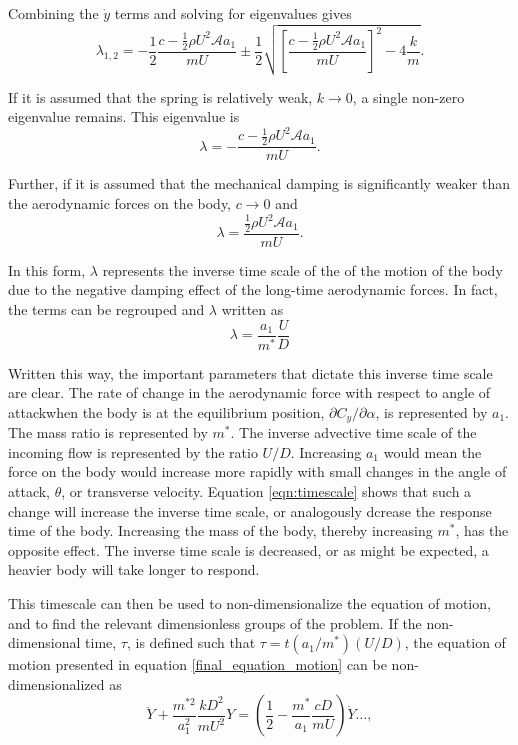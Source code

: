 Combining the $\dot{y}$ terms and solving for eigenvalues gives
\begin{equation}
  \label{eqn:eigs}
  \lambda_{1,2}= -\frac{1}{2}\frac{c-\frac{1}{2}\rho U^2\mathcal{A}a_1}{mU}\pm\frac{1}{2}\sqrt{\left[\frac{c-\frac{1}{2}\rho U^2\mathcal{A}a_1}{mU}\right]^2-4\frac{k}{m}}.
\end{equation}

If it is assumed that the spring is relatively weak, $k\rightarrow 0$, a single non-zero eigenvalue remains. This eigenvalue is
\begin{equation}
  \label{eqn:eigs_nospring}
  \lambda=-\frac{c-\frac{1}{2}\rho U^2\mathcal{A}a_1}{mU}.
\end{equation}

Further, if it is assumed that the mechanical damping is significantly weaker than the aerodynamic forces on the body, $c\rightarrow 0$ and
\begin{equation}
  \label{eqn:eigs_nospring_nodamp}
  \lambda=\frac{\frac{1}{2}\rho U^2\mathcal{A}a_1}{mU}.
\end{equation}

In this form, $\lambda$ represents the inverse time scale of the of the motion of the body due to the negative damping effect of the long-time aerodynamic forces. In fact, the terms can be regrouped and $\lambda$ written as
\begin{equation}
  \label{eqn:timescale}
  \lambda = \frac{a_1}{m^*}\frac{U}{D}
\end{equation}

Written this way, the important parameters that dictate this inverse time scale are clear. The rate of change in the aerodynamic force with respect to angle of attackwhen the body is at the equilibrium position, $\partial C_y/\partial \alpha$, is represented by $a_1$. The mass ratio is represented by $m^*$. The inverse advective time scale of the incoming flow is represented by the ratio $U/D$. Increasing $a_1$ would mean the force on the body would increase more rapidly with small changes in the angle of attack, $\theta$, or transverse velocity. Equation \ref{eqn:timescale} shows that such a change will increase the inverse time scale, or analogously dcrease the response time of the body. Increasing the mass of the body, thereby increasing $m^*$, has the opposite effect. The inverse time scale is decreased, or as might be expected, a heavier body will take longer to respond.

This timescale can then be used to non-dimensionalize the equation of motion, and to find the relevant dimensionless groups of the problem. If the non-dimensional time, $\tau$, is defined such that $\tau=t(a_1/m^*)(U/D)$, the equation of motion presented in equation \ref{final_equation_motion} can be non-dimensionalized as
\begin{equation}
  \label{eqn:eom_nondim}
  \ddot{Y} + \frac{m^{*2}}{a_1^2}\frac{kD^2}{mU^2}Y = \left(\frac{1}{2} - \frac{m^*}{a_1}\frac{cD}{mU}\right)\dot{Y} \dots,
\end{equation}

